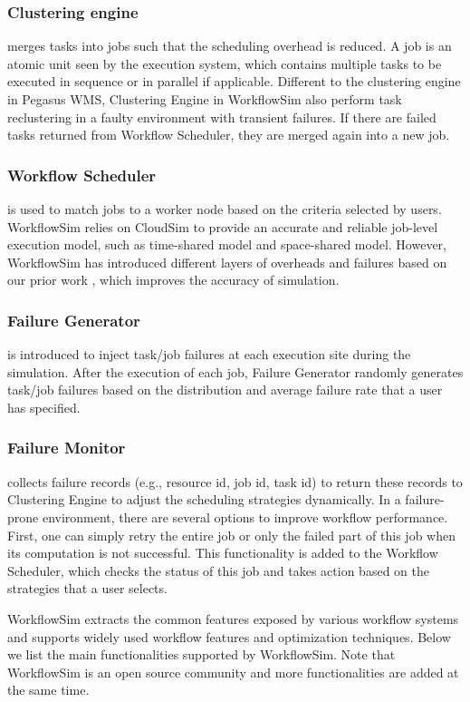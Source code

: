 \subsubsection{Clustering engine} merges tasks into jobs such that the scheduling overhead is reduced. A job is an atomic unit seen by the execution system, which contains multiple tasks to be executed in sequence or in parallel if applicable. Different to the clustering engine in Pegasus WMS, Clustering Engine in WorkflowSim also perform task reclustering in a faulty environment with transient failures. If there are failed tasks returned from Workflow Scheduler, they are merged again into a new job.  
\subsubsection{Workflow Scheduler} is used to match jobs to a worker node based on the criteria selected by users. WorkflowSim relies on CloudSim to provide an accurate and reliable job-level execution model, such as time-shared model and space-shared model. However, WorkflowSim has introduced different layers of overheads and failures based on our prior work \cite{Chen2011}, which improves the accuracy of simulation. 
\subsubsection{Failure Generator} is introduced to inject task/job failures at each execution site during the simulation. After the execution of each job, Failure Generator randomly generates task/job failures based on the distribution and average failure rate that a user has specified. 
\subsubsection{Failure Monitor} collects failure records (e.g., resource id, job id, task id) to return these records to Clustering Engine to adjust the scheduling strategies dynamically. In a failure-prone environment, there are several options to improve workflow performance. First, one can simply retry the entire job or only the failed part of this job when its computation is not successful.  This functionality is added to the Workflow Scheduler, which checks the status of this job and takes action based on the strategies that a user selects. 


WorkflowSim extracts the common features exposed by various workflow systems and supports widely used workflow features and optimization techniques. Below we list the main functionalities supported by WorkflowSim. Note that WorkflowSim is an open source community and more functionalities are added at the same time. 


